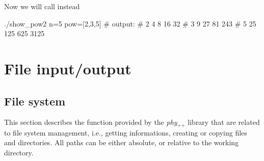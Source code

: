 \documentclass[12pt]{report}
\newcommand{\phypp}{\textit{phy}$_{\text{++}}$\xspace}
\begin{document}
Now we will call instead
\begin{bashcode}
./show_pow2 n=5 pow=[2,3,5]
# output:
# 2 4 8 16 32
# 3 9 27 81 243
# 5 25 125 625 3125
\end{bashcode}

\section{File input/output \label{SEC:support:file}}

\subsection{File system \label{SEC:support:file:system}}

This section describes the function provided by the \phypp library that are related to file system management, i.e., getting informations, creating or copying files and directories. All paths can be either absolute, or relative to the working directory.
\end{document}
